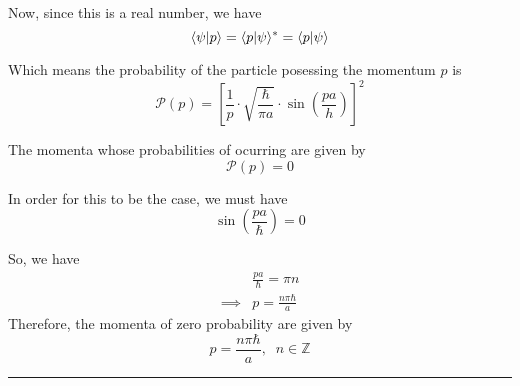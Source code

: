 \documentclass[twoside]{article}
\def\beginrefs{\begin{list}%
        {[\arabic{equation}]}{\usecounter{equation}
         \setlength{\leftmargin}{2.0truecm}\setlength{\labelsep}{0.4truecm}%
         \setlength{\labelwidth}{1.6truecm}}}
\def\endrefs{\end{list}}
\def\bibentry#1{\item[\hbox{[#1]}]}
\begin{document}
\begin{enumerate}
   Now, since this is a real number, we have 
   \[ \langle \psi | p \rangle = \langle p | \psi \rangle^{*} = \langle p | \psi \rangle \]

   Which means the probability of the particle posessing the momentum $p$ is 
   \[ \mathcal{P}(p) = \left[ \frac{1}{p} \cdot \sqrt{\frac{\hbar}{\pi a}}\cdot \sin\left(\frac{pa}{h}\right) \right]^2 \]


   The momenta whose probabilities of ocurring are given by 
   \[ \mathcal{P}(p) = 0 \]

   In order for this to be the case, we must have \[ \sin\left(\frac{pa}{\hbar}\right) = 0 \]

   So, we have 
   \begin{align*}
      &\frac{pa}{\hbar} = \pi n \\
      \implies &p = \frac{n\pi\hbar}{a}
   \end{align*}
   Therefore, the momenta of zero probability are given by 
   \[ \boxed{p = \frac{n\pi\hbar}{a},\;\;n \in \mathbb{Z}} \]
\end{enumerate}

\hrule


\end{document}
